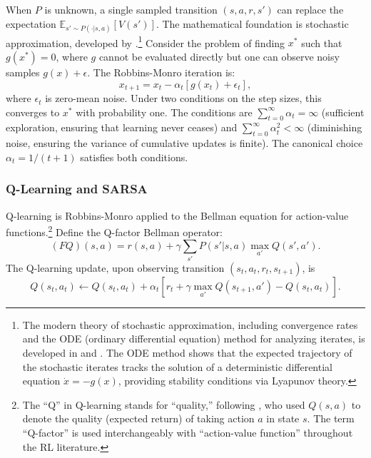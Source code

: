 When $P$ is unknown, a single sampled transition $(s, a, r, s')$ can replace the expectation $\mathbb{E}_{s' \sim P(\cdot|s,a)}[V(s')]$. The mathematical foundation is stochastic approximation, developed by \citet{Robbins1952}.\footnote{The modern theory of stochastic approximation, including convergence rates and the ODE (ordinary differential equation) method for analyzing iterates, is developed in \citet{kushner1978} and \citet{borkar2000}. The ODE method shows that the expected trajectory of the stochastic iterates tracks the solution of a deterministic differential equation $\dot{x} = -g(x)$, providing stability conditions via Lyapunov theory.} Consider the problem of finding $x^*$ such that $g(x^*) = 0$, where $g$ cannot be evaluated directly but one can observe noisy samples $g(x) + \epsilon$. The Robbins-Monro iteration is:
\begin{equation}
x_{t+1} = x_t - \alpha_t [g(x_t) + \epsilon_t],
\label{eq:robbins_monro}
\end{equation}
where $\epsilon_t$ is zero-mean noise. Under two conditions on the step sizes, this converges to $x^*$ with probability one. The conditions are $\sum_{t=0}^\infty \alpha_t = \infty$ (sufficient exploration, ensuring that learning never ceases) and $\sum_{t=0}^\infty \alpha_t^2 < \infty$ (diminishing noise, ensuring the variance of cumulative updates is finite). The canonical choice $\alpha_t = 1/(t+1)$ satisfies both conditions.

\subsubsection{Q-Learning and SARSA}

Q-learning \citep{WatkinsDayan1992} is Robbins-Monro applied to the Bellman equation for action-value functions.\footnote{The ``Q'' in Q-learning stands for ``quality,'' following \citet{WatkinsDayan1992}, who used $Q(s,a)$ to denote the quality (expected return) of taking action $a$ in state $s$. The term ``Q-factor'' is used interchangeably with ``action-value function'' throughout the RL literature.} Define the Q-factor Bellman operator:
\begin{equation}
(FQ)(s,a) = r(s,a) + \gamma \sum_{s'} P(s'|s,a) \max_{a'} Q(s',a').
\end{equation}
The Q-learning update, upon observing transition $(s_t, a_t, r_t, s_{t+1})$, is
\begin{equation}
Q(s_t, a_t) \leftarrow Q(s_t, a_t) + \alpha_t \left[ r_t + \gamma \max_{a'} Q(s_{t+1}, a') - Q(s_t, a_t) \right].
\label{eq:qlearning}
\end{equation}

